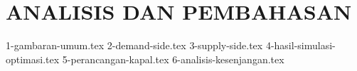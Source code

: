 \chapter{ANALISIS DAN PEMBAHASAN}
\label{chap:analisis-pembahasan}

{1-gambaran-umum.tex}
{2-demand-side.tex}
{3-supply-side.tex}
{4-hasil-simulasi-optimasi.tex}
{5-perancangan-kapal.tex}
{6-analisis-kesenjangan.tex}